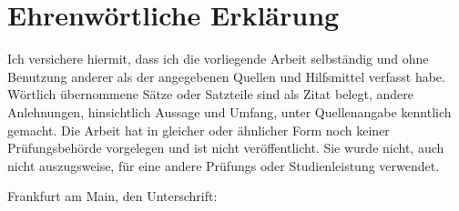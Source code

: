 \documentclass[11pt]{article}
\begin{document}
\section*{Ehrenw\"ortliche Erkl\"arung}
\noindent
Ich versichere hiermit, dass ich die vorliegende Arbeit 
selbst\"andig und ohne Benutzung anderer als der angegebenen  Quellen  
und Hilfsmittel verfasst habe. W\"ortlich  \"ubernommene  S\"atze  oder  
Satzteile  sind  als  Zitat  belegt, andere Anlehnungen, hinsichtlich Aussage 
und Umfang, unter Quellenangabe kenntlich gemacht. Die Arbeit hat in gleicher 
oder \"ahnlicher Form noch keiner Pr\"ufungsbeh\"orde vorgelegen und ist nicht 
ver\"offentlicht. Sie wurde nicht, auch nicht auszugsweise, f\"ur eine andere 
Pr\"ufungs oder Studienleistung verwendet.
\vspace{1cm}

\noindent
Frankfurt am Main, den  \hspace{3cm} Unterschrift:
\end{document}
